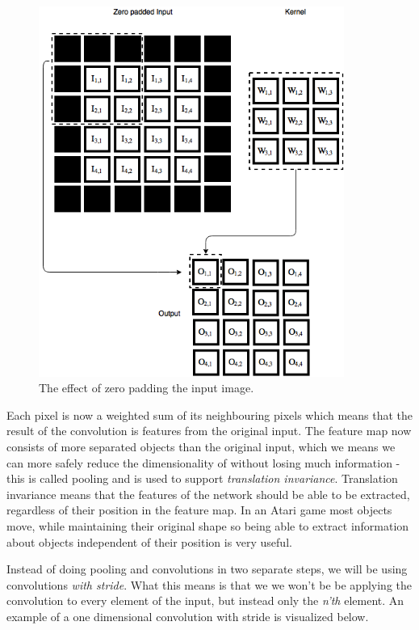 \documentclass[11pt]{article}
\begin{document}
\begin{figure}[!h]\label{con2}
    \centering
    \includegraphics[width=10cm]{include/conv_2_zero_pad.png}
    \caption{The effect of zero padding the input image.}
    \label{fig:conv}
\end{figure}

Each pixel is now a weighted sum of its neighbouring pixels
which means that the result of the convolution is features from
the original input.
The feature map now consists of more separated objects than the original input,
which we means we can more safely reduce the dimensionality of without losing much information - 
this is called pooling and is used to support \textit{translation invariance}.
Translation invariance means that the features of the network should be able to
be extracted, regardless of their position in the feature map.
In an Atari game most objects move, while maintaining their original shape so being able to
extract information about objects independent of their position is very useful.

Instead of doing pooling and convolutions in two separate steps, we will be using 
convolutions \textit{with stride}.
What this means is that we we won't be be applying the convolution to 
every element of the input, but instead only the \textit{n'th} element.
An example of a one dimensional convolution with stride is visualized below.
\end{document}
